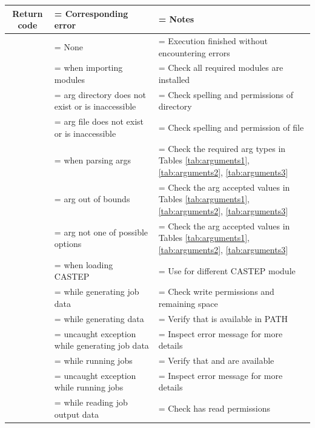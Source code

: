 \begin{table}[h]
\begin{tabularx}{1\linewidth}{|c|>{\hsize\linewidth=\hsize}Y|>{\hsize\linewidth=\hsize}Y|}
\hline \hline
\textbf{Return code} & \textbf{Corresponding error} & \textbf{Notes} \\ \hline
{} & None & Execution finished without encountering errors \\ \hline \hline
{} &  when importing modules & Check all required modules are installed \\ \hline
{} & arg directory does not exist or is inaccessible & Check spelling and permissions of directory \\ \hline
{} & arg file does not exist or is inaccessible & Check spelling and permission of file \\ \hline
{} &  when parsing args & Check the required arg types in Tables \ref{tab:arguments1}, \ref{tab:arguments2}, \ref{tab:arguments3} \\ \hline
{} & arg out of bounds & Check the arg accepted values in Tables \ref{tab:arguments1}, \ref{tab:arguments2}, \ref{tab:arguments3} \\ \hline
{} & arg not one of possible options & Check the arg accepted values in Tables \ref{tab:arguments1}, \ref{tab:arguments2}, \ref{tab:arguments3} \\ \hline
{} &  when loading CASTEP & Use  for different CASTEP module \\ \hline \hline
{} &  while generating job data & Check write permissions and remaining space \\ \hline
{} &  while generating data & Verify that  is available in PATH \\ \hline
{} & uncaught exception while generating job data & Inspect error message for more details \\ \hline \hline
{} &  while running jobs & Verify that  and  are available \\ \hline
{} & uncaught exception while running jobs & Inspect error message for more details \\ \hline \hline
{} &  while reading job output data & Check  has read permissions \\ \hline

\end{tabularx}
\end{table}
